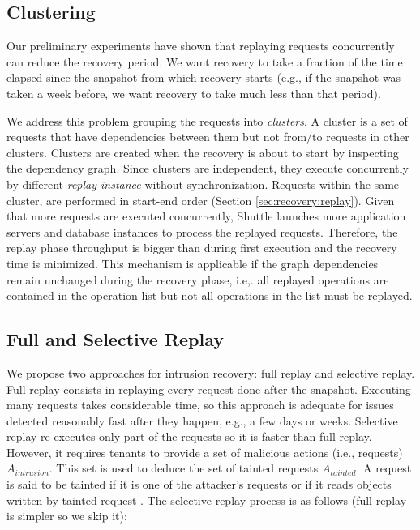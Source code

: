 \subsection{Clustering}
\label{sec:recovery:clusters}
Our preliminary experiments have shown that replaying requests concurrently can reduce the recovery period. We want recovery to take a fraction of the time elapsed since the snapshot from which recovery starts (e.g., if the snapshot was taken a week before, we want recovery to take much less than that period). 

We address this problem grouping the requests into \emph{clusters}. A cluster is a set of requests that have dependencies between them but not from/to requests in other clusters. Clusters are created when the recovery is about to start by inspecting the dependency graph. Since clusters are independent, they execute concurrently by different \emph{replay instance} without synchronization. Requests within the same cluster, are performed in start-end order (Section \ref{sec:recovery:replay}). Given that more requests are executed concurrently, Shuttle launches more application servers and database instances to process the replayed requests. Therefore, the replay phase throughput is bigger than during first execution and the recovery time is minimized. This mechanism is applicable if the graph dependencies remain unchanged during the recovery phase, i.e,. all replayed operations are contained in the operation list but not all operations in the list must be replayed.


\subsection{Full and Selective Replay}
\label{sec:recovery:selective_replay}

We propose two approaches for intrusion recovery: full replay and selective replay. Full replay consists in replaying every request done after the  snapshot. Executing many requests takes considerable time, so this approach is adequate for issues detected reasonably fast after they happen, e.g., a few days or weeks. Selective replay re-executes only part of the requests so it is faster than full-replay. However, it requires tenants to provide a set of malicious actions (i.e., requests) $A_{intrusion}$. This set is used to deduce the set of tainted requests $A_{tainted}$. A request is said to be tainted if it is one of the attacker’s requests or if it reads objects written by tainted request \cite{taser,itdb,phoenix}.  The selective replay process is as follows (full replay is simpler so we skip it):

